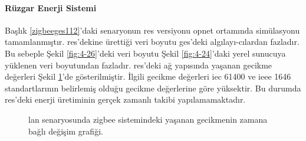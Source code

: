 \newpage
\paragraph{Rüzgar Enerji Sistemi}
Başlık \ref{zigbeeges112}'daki senaryonun \gls{res} versiyonu \gls{opnet} ortamında simülasyonu tamamlanmıştır. \gls{res}'dekine  ürettiği veri boyutu \gls{ges}'deki algılayı-cılardan fazladır. Bu sebeple Şekil \ref{fig:4-26}'deki veri boyutu Şekil \ref{fig:4-24}'daki yerel sunucuya yüklenen veri boyutundan fazladır. \gls{res}'deki ağ yapısında yaşanan gecikme değerleri Şekil \ref{fig:4-25}'de gösterilmiştir. İlgili gecikme değerleri \gls{iec} 61400 ve \gls{ieee} 1646 standartlarının belirlemiş olduğu gecikme değerlerine göre yüksektir. Bu durumda \gls{res}'deki enerji üretiminin gerçek zamanlı takibi yapılamamaktadır. 

\begin{figure}[htbp]
\centering



\caption{\gls{lan} senaryosunda zigbee sistemindeki yaşanan gecikmenin zamana bağlı değişim grafiği.}\label{fig:4-25}
\end{figure}

